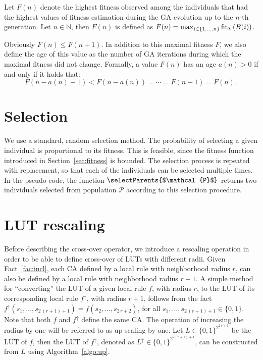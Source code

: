 Let $F(n)$ denote the highest fitness observed among the individuals that had the highest values of fitness estimation during the GA evolution up to the $n$-th generation. Let $n\in\mathbb{N}$, then $F(n)$ is defined as $F(n) = \max_{i\in\{1,\dotsc,n\}} \operatorname{fit}_{\mathcal{I}}\left(B(i)\right)$.

Obviously $F(n)\leq F(n+1)$. In addition to this maximal fitness $F$, we also define the age of this value as the number of GA iterations during which the maximal fitness did not change. Formally, a value $F(n)$ has an age $a(n)>0$ if and only if it holds that:
\[F(n-a(n)-1) < F(n-a(n)) = \cdots = F(n-1) = F(n)\,.\]

\section{Selection}\label{sec:select}
We use a standard, random selection method. The probability of selecting a given individual is proportional to its fitness. This is feasible, since the fitness function introduced in Section~\ref{sec:fitness} is bounded. The selection process is repeated with replacement, so that each of the individuals can be selected multiple times.
In the pseudo-code, the function $\selectParents{$\mathcal{P}$}$ returns two individuals selected from population $\mathcal{P}$ according to this selection procedure.

\section{LUT rescaling}\label{sec:rescal}
Before describing the cross-over operator, we introduce a rescaling operation in order to be able to define cross-over of LUTs with different radii. Given Fact~\ref{fac:incl}, each CA defined by a local rule with neighborhood radius $r$, can also be defined by a local rule with neighborhood radius $r+1$. A simple method for ``converting'' the LUT of a given local rule $f$, with radius $r$, to the LUT of its corresponding local rule $f^\uparrow$, with radius $r+1$, follows from the fact $f^\uparrow(s_1, \dotsc, s_{2\,(r+1)+1}) = f(s_2,\dotsc,s_{2\,r+2})$, for all $s_1,\dotsc,s_{2\,(r+1)+1}\in\{0,1\}$. Note that both $f$ and $f^\uparrow$ define the same CA. The operation of increasing the radius by one will be referred to as up-scaling by one. Let $L\in\{0,1\}^{2^{2\,r+1}}$ be the LUT of $f$, then the LUT of $f^\uparrow$, denoted as $L^\uparrow\in\{0,1\}^{2^{2(r+1)+1}}$, can be constructed from $L$ using Algorithm~\ref{algo:up}.

